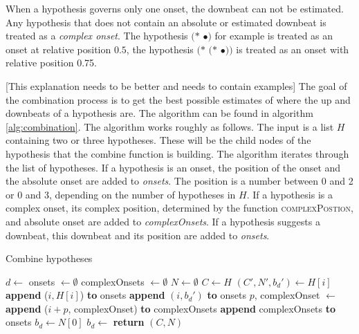 When a hypothesis governs only one onset, the downbeat can not be estimated. Any hypothesis that does not contain an absolute or estimated downbeat is treated as a \textit{complex onset}. The hypothesis $(*$ $\bullet)$ for example is treated as an onset at relative position $0.5$, the hypothesis $(*$ $(*$ $\bullet))$ is treated as an onset with relative position 0.75.

[This explanation needs to be better and needs to contain examples]
The goal of the combination process is to get the best possible estimates of where the up and downbeats of a hypothesis are. The algorithm can be found in algorithm \ref{alg:combination}. The algorithm works roughly as follows. The input is a list $H$ containing two or three hypotheses. These will be the child nodes of the hypothesis that the combine function is building. The algorithm iterates through the list of hypotheses. If a hypothesis is an onset, the position of the onset and the absolute onset are added to \textit{onsets}. The position is a number between 0 and 2 or 0 and 3, depending on the number of hypotheses in $H$. If a hypothesis is a complex onset, its complex position, determined by the function \textsc{complexPostion}, and absolute onset are added to \textit{complexOnsets}. If a hypothesis suggests a downbeat, this downbeat and its position are added to \textit{onsets}.

\begin{algorithm}
\caption{Combine hypotheses}
\label{alg:combination}
\begin{algorithmic}
	\State $d \leftarrow$ 
	\State onsets $\leftarrow \emptyset$
	\State complexOnsets $\leftarrow \emptyset$
	\State $N \leftarrow \emptyset$
	\State $C \leftarrow H$
		\State $(C', N', b_d') \leftarrow H[i]$
			\State \textbf{append} ($i, H[i]$) \textbf{to} onsets
		\Else
				\State \textbf{append} $(i, b_d')$ \textbf{to} onsets
			\Else
				\State $p$, complexOnset $\leftarrow$ 
				\State \textbf{append} ($i + p$, complexOnset) \textbf{to} complexOnsets
			\EndIf
		\EndIf
	\EndFor
		\State \textbf{append} complexOnsets \textbf{to} onsets
	\EndIf
	\State $b_d \leftarrow N[0]$
		\State $b_d \leftarrow$ 
	\EndIf
	\State \textbf{return} $(C, N)$
\EndFunction
\end{algorithmic}
\end{algorithm}

